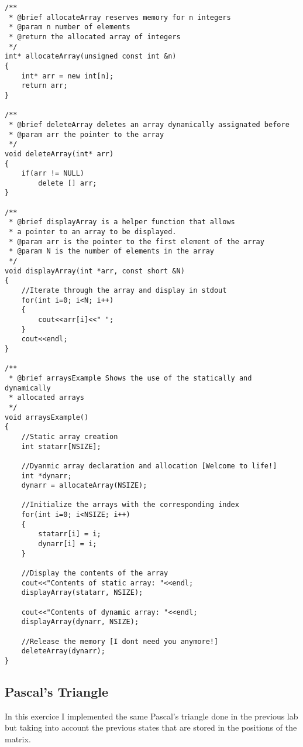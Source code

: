 \documentclass{article}
\begin{document}
\begin{lstlisting}[label=lst_mono,caption=ArrayExample]
/**
 * @brief allocateArray reserves memory for n integers
 * @param n number of elements
 * @return the allocated array of integers
 */
int* allocateArray(unsigned const int &n)
{
	int* arr = new int[n];
	return arr;
}

/**
 * @brief deleteArray deletes an array dynamically assignated before
 * @param arr the pointer to the array
 */
void deleteArray(int* arr)
{
	if(arr != NULL)
		delete [] arr;
}

/**
 * @brief displayArray is a helper function that allows
 * a pointer to an array to be displayed.
 * @param arr is the pointer to the first element of the array
 * @param N is the number of elements in the array
 */
void displayArray(int *arr, const short &N)
{
	//Iterate through the array and display in stdout
	for(int i=0; i<N; i++)
	{
		cout<<arr[i]<<" ";
	}
	cout<<endl;
}

/**
 * @brief arraysExample Shows the use of the statically and dynamically
 * allocated arrays
 */
void arraysExample()
{
	//Static array creation
	int statarr[NSIZE];

	//Dyanmic array declaration and allocation [Welcome to life!]
	int *dynarr;
	dynarr = allocateArray(NSIZE);

	//Initialize the arrays with the corresponding index
	for(int i=0; i<NSIZE; i++)
	{
		statarr[i] = i;
		dynarr[i] = i;
	}

	//Display the contents of the array
	cout<<"Contents of static array: "<<endl;
	displayArray(statarr, NSIZE);

	cout<<"Contents of dynamic array: "<<endl;
	displayArray(dynarr, NSIZE);

	//Release the memory [I dont need you anymore!]
	deleteArray(dynarr);
}

\end{lstlisting} 

\subsection{Pascal's Triangle}

In this exercice I implemented the same Pascal's triangle done
in the previous lab but taking into account the previous states
that are stored in the positions of the matrix.
\end{document}
